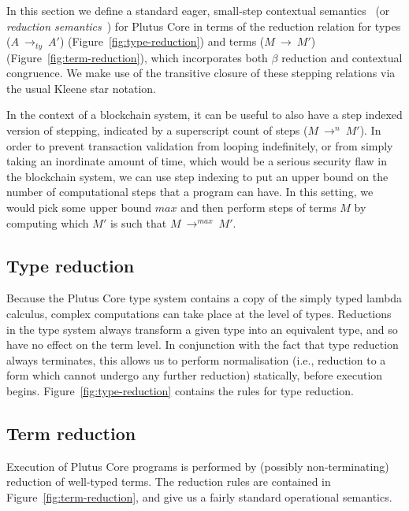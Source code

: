 \documentclass[a4paper]{article}
\newcommand{\typeStep}[2]{#1 ~ \rightarrow_{ty} ~ #2}
\newcommand{\step}[2]{#1 ~ \rightarrow ~ #2}
\newcommand{\multistepIndexed}[3]{#1 ~ \rightarrow^{#2} ~ #3}
\begin{document}
In this section we define a standard eager,
small-step contextual semantics~\cite[5.3]{Harper:PFPL} (or
\textit{reduction semantics}~\cite[\S2]{Felleisen-Hieb}) for Plutus
Core in terms of the reduction relation for types
(\(\typeStep{A}{A'}\)) (Figure~\ref{fig:type-reduction}) 
and terms (\(\step{M}{M'}\)) (Figure~\ref{fig:term-reduction}), which
incorporates both $\beta$ reduction and contextual congruence. We make
use of the transitive closure of these stepping relations via the
usual Kleene star notation.

In the context of a blockchain system, it can be useful to also have a
step indexed version of stepping, indicated by a superscript count of
steps (\(\multistepIndexed{M}{n}{M'}\)). In order to prevent
transaction validation from looping indefinitely, or from simply
taking an inordinate amount of time, which would be a serious security
flaw in the blockchain system, we can use step indexing to put an
upper bound on the number of computational steps that a program can
have. In this setting, we would pick some upper bound $\mathit{max}$
and then perform steps of terms $M$ by computing which $M'$ is such
that \(\multistepIndexed{M}{\mathit{max}}{M'}\).


\newpage 

\subsection{Type reduction}
Because the Plutus Core type system contains a copy of the simply
typed lambda calculus, complex computations can take place at the
level of types.  Reductions in the type system always transform a
given type into an equivalent type, and so have no effect on the term
level.  In conjunction with the fact that type reduction always
terminates, this allows us to perform normalisation (i.e., reduction to
a form which cannot undergo any further reduction) statically, before
execution begins.  Figure~\ref{fig:type-reduction} contains the rules
for type reduction.




\subsection{Term reduction}
Execution of Plutus Core programs is performed by (possibly
non-terminating) reduction of well-typed terms.  The reduction rules
are contained in Figure~\ref{fig:term-reduction}, and give us a fairly
standard operational semantics.
\end{document}

